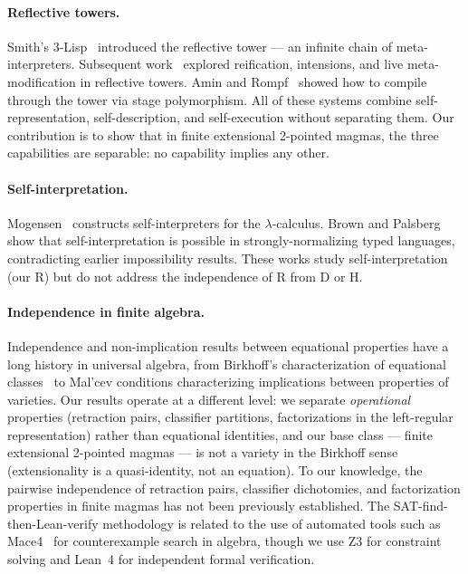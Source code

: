 \documentclass[sigconf,screen]{acmart}
\theoremstyle{remark}
\begin{document}
\paragraph{Reflective towers.}
Smith's 3-Lisp~\cite{smith84} introduced the reflective tower --- an infinite chain of meta-interpreters. Subsequent work~\cite{friedman84,danvy88} explored reification, intensions, and live meta-modification in reflective towers. Amin and Rompf~\cite{amin18} showed how to compile through the tower via stage polymorphism. All of these systems combine self-representation, self-description, and self-execution without separating them. Our contribution is to show that in finite extensional 2-pointed magmas, the three capabilities are separable: no capability implies any other.

\paragraph{Self-interpretation.}
Mogensen~\cite{mogensen92} constructs self-interpreters for the $\lambda$-calculus. Brown and Palsberg~\cite{brown16} show that self-interpretation is possible in strongly-normalizing typed languages, contradicting earlier impossibility results. These works study self-interpretation (our R) but do not address the independence of R from D or H.

\paragraph{Independence in finite algebra.}
Independence and non-implication results between equational properties have a long history in universal algebra, from Birkhoff's characterization of equational classes~\cite{burris81} to Mal'cev conditions characterizing implications between properties of varieties. Our results operate at a different level: we separate \emph{operational} properties (retraction pairs, classifier partitions, factorizations in the left-regular representation) rather than equational identities, and our base class --- finite extensional 2-pointed magmas --- is not a variety in the Birkhoff sense (extensionality is a quasi-identity, not an equation). To our knowledge, the pairwise independence of retraction pairs, classifier dichotomies, and factorization properties in finite magmas has not been previously established. The SAT-find-then-Lean-verify methodology is related to the use of automated tools such as Mace4~\cite{mccune10} for counterexample search in algebra, though we use Z3 for constraint solving and Lean~4 for independent formal verification.
\end{document}
